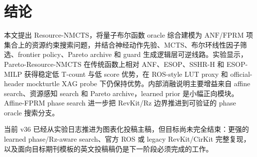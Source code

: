 \documentclass[UTF8,fontset=macnew,11pt]{ctexart}
\newcommand{\method}{Resource-NMCTS}
\newcommand{\anf}{\ensuremath{\mathrm{ANF}}}
\newcommand{\fprm}{\ensuremath{\mathrm{FPRM}}}
\newcommand{\mcts}{\ensuremath{\mathrm{MCTS}}}
\begin{document}
\section{结论}

本文提出 \method{}，将量子布尔函数 oracle 综合建模为 \anf{}/\fprm{} 项集合上的资源约束搜索问题，并结合神经动作先验、\mcts{}、布尔环线性因子筛选、frontier policy、Pareto archive 和 guard 生成逻辑层可逆线路。实验显示，Pareto-\method{} 在传统函数上相对 ANF、ESOP、SSHR-H 和 ESOP-MILP 获得稳定低 T-count 与低 score 优势，在 ROS-style LUT proxy 和 official-header mockturtle XAG probe 下仍保持优势。内部消融说明主要增益来自 affine search、资源感知 search 和 Pareto archive，learned prior 是小幅正向模块。Affine-FPRM phase search 进一步把 RevKit/Rz 边界推进到可验证的 phase oracle 搜索分支。

当前 v36 已经从实验日志推进为图表化投稿主稿，但目标尚未完全结束：更强的 learned phase/Rz-aware search、官方 ROS 或 legacy RevKit/CirKit 完整复现，以及面向目标期刊模板的英文投稿稿仍是下一阶段必须完成的工作。
\end{document}
